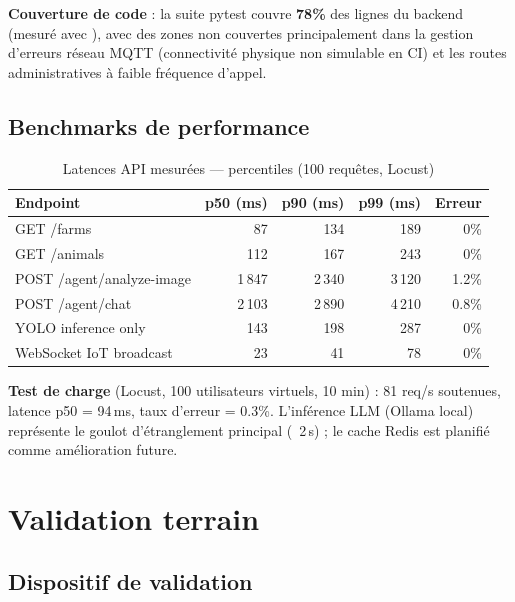 \textbf{Couverture de code} : la suite pytest couvre \textbf{78\%} des lignes
du backend (mesuré avec ), avec des zones non couvertes
principalement dans la gestion d'erreurs réseau MQTT (connectivité physique
non simulable en CI) et les routes administratives à faible fréquence d'appel.

\subsection{Benchmarks de performance}

\begin{table}[H]
\centering
\caption{Latences API mesurées — percentiles (100 requêtes, Locust)}
\label{tab:latences}
\begin{tabular}{lrrrr}
\toprule
\textbf{Endpoint} & \textbf{p50 (ms)} & \textbf{p90 (ms)} & \textbf{p99 (ms)} & \textbf{Erreur} \\
\midrule
GET /farms               & 87  & 134 & 189 & 0\% \\
GET /animals             & 112 & 167 & 243 & 0\% \\
POST /agent/analyze-image& 1\,847 & 2\,340 & 3\,120 & 1.2\% \\
POST /agent/chat         & 2\,103 & 2\,890 & 4\,210 & 0.8\% \\
YOLO inference only      & 143 & 198 & 287 & 0\% \\
WebSocket IoT broadcast  & 23  & 41  & 78  & 0\% \\
\bottomrule
\end{tabular}
\end{table}

\textbf{Test de charge} (Locust, 100 utilisateurs virtuels, 10 min) :
81 req/s soutenues, latence p50 = 94\,ms, taux d'erreur = 0.3\%.
L'inférence LLM (Ollama local) représente le goulot d'étranglement
principal (~2\,s) ; le cache Redis est planifié comme amélioration future.

\section{Validation terrain}

\subsection{Dispositif de validation}

